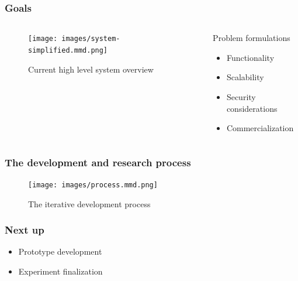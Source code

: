 \documentclass[10pt]{beamer}
\renewcommand{\section}[1]{\frametitle{#1}}
\begin{document}
    \begin{frame}
        \section{Goals}
		\pause

		\begin{columns}
			\begin{column}{0.6\textwidth}
				\begin{figure}
					\texttt{[image: images/system-simplified.mmd.png]}
					\caption{Current high level system overview}
				\end{figure}
			\end{column}
			\begin{column}{0.5\textwidth}
				\pause
				Problem formulations
				\begin{itemize}
					\pause
					\item Functionality
					\pause
					\item Scalability
					\pause
					\item Security considerations
					\pause
					\item Commercialization
				\end{itemize}
			\end{column}
		\end{columns}
    \end{frame}

    \begin{frame}
        \section{The development and research process}
		\begin{figure}
			\texttt{[image: images/process.mmd.png]}
			\caption{The iterative development process}
		\end{figure}
    \end{frame}

    \begin{frame}
        \section{Next up}
        \begin{itemize}
			\pause
            \item Prototype development
			\pause
            \item Experiment finalization
        \end{itemize}
    \end{frame}
\end{document}
